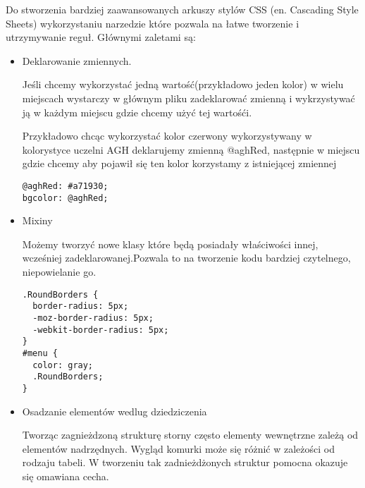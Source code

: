 Do stworzenia bardziej zaawansowanych arkuszy stylów CSS (en. Cascading Style Sheets) wykorzystaniu narzedzie które pozwala na łatwe tworzenie i utrzymywanie reguł. Głównymi zaletami są:

\begin{itemize}
\item
Deklarowanie zmiennych.

Jeśli chcemy wykorzystać jedną wartość(przykładowo jeden kolor) w wielu miejscach wystarczy w głównym pliku zadeklarować zmienną i wykrzystywać ją w każdym miejscu gdzie chcemy użyć tej wartośći.

Przykładowo chcąc wykorzystać kolor czerwony wykorzystywany w kolorystyce uczelni AGH deklarujemy zmienną @aghRed, następnie w miejscu gdzie chcemy aby pojawił się ten kolor korzystamy z istniejącej zmiennej

\lstset{language=JavaScript}
\label{lis:webSql}
\begin{lstlisting}[caption=json]
@aghRed: #a71930;
bgcolor: @aghRed;
\end{lstlisting}

\item
Mixiny

Możemy tworzyć nowe klasy które będą posiadały właściwości innej, wcześniej zadeklarowanej.Pozwala to na tworzenie kodu bardziej czytelnego, niepowielanie go.


\lstset{language=JavaScript}
\label{lis:webSql}
\begin{lstlisting}[caption=json]
.RoundBorders {
  border-radius: 5px;
  -moz-border-radius: 5px;
  -webkit-border-radius: 5px;
}
#menu {
  color: gray;
  .RoundBorders;
}
\end{lstlisting}

\item
Osadzanie elementów wedlug dziedziczenia

Tworząc zagnieżdzoną strukturę storny często elementy wewnętrzne zależą od elementów nadrzędnych. Wygląd komurki może się różnić w zależości od rodzaju tabeli. W tworzeniu tak zadnieżdżonych struktur pomocna okazuje się omawiana cecha.

\end{itemize}
